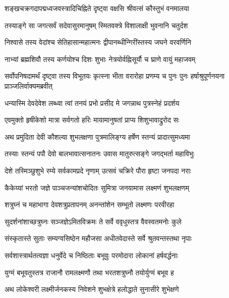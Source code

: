\twolineshloka
{शङ्खचक्रगदापद्मध्वजवस्त्रादिचिह्निते}
{दृष्ट्वा वक्षसि श्रीवत्सं कौस्तुभं वनमालया}%

\twolineshloka
{तस्याङ्गे सा जगत्सर्वं सदेवासुरमानुषम्}
{स्मितवक्त्रे विशालाक्षी भुवनानि चतुर्दश}%

\twolineshloka
{निश्वासे तस्य वेदांश्च सेतिहासान्महात्मनः}
{द्वीपानब्धीन्गिरींस्तस्य जघने वरवर्णिनि}%

\twolineshloka
{नाभ्यां ब्रह्मशिवौ तस्य कर्णयोश्च दिशः शुभाः}
{नेत्रयोर्वह्निसूर्यौ च घ्राणे वायुं महाजवम्}%


\threelineshloka
{सर्वोपनिषदामर्थं दृष्ट्वा तस्य विभूतयः}
{कृत्स्ना भीता वरारोहा प्रणम्य च पुनः पुनः}
{हर्षाश्रुपूर्णनयना प्राञ्जलिर्वाक्यमब्रवीत्}%


\twolineshloka
{धन्यास्मि देवदेवेश लब्ध्वा त्वां तनयं प्रभो}
{प्रसीद मे जगन्नाथ पुत्रस्नेहं प्रदर्शय}%


\twolineshloka
{एवमुक्तो हृषीकेशो मात्रा सर्वगतो हरिः}
{मायामानुषतां प्राप्य शिशुभावाद्रुरोद सः}%

\twolineshloka
{अथ प्रमुदिता देवी कौशल्या शुभलक्षणा}
{पुत्रमालिङ्ग्य हर्षेण स्तन्यं प्रादात्सुमध्यमा}%

\twolineshloka
{तस्याः स्तन्यं पपौ देवो बालभावात्सनातनः}
{उवास मातुरुत्सङ्गे जगद्भर्ता महाविभुः}%

\twolineshloka
{देशे तस्मिञ्छुशुभे रम्ये सर्वकामप्रदे नृणाम्}
{उत्सवं चक्रिरे पौरा हृष्टा जनपदा नराः}%

\twolineshloka
{कैकेय्यां भरतो जज्ञे पाञ्चजन्यांशचोदितः}
{सुमित्रा जनयामास लक्ष्मणं शुभलक्षणम्}%

\twolineshloka
{शत्रुघ्नं च महाभागा देवशत्रुप्रतापनम्}
{अनन्तांशेन सम्भूतो लक्ष्मणः परवीरहा}%

\twolineshloka
{सुदर्शनांशाच्छत्रुघ्नः सञ्जज्ञेऽमितविक्रमः}
{ते सर्वे ववृधुस्तत्र वैवस्वतमनोः कुले}%

\twolineshloka
{संस्कृतास्ते सुताः सम्यग्वसिष्ठेन महौजसा}
{अधीतवेदास्ते सर्वे श्रुतवन्तस्तथा नृपाः}%

\twolineshloka
{सर्वशास्त्रार्थतत्वज्ञा धनुर्वेदे च निष्ठिताः}
{बभूवुः परमोदारा लोकानां हर्षवर्द्धनाः}%

\twolineshloka
{युग्मं बभूवतुस्तत्र राजानौ रामलक्ष्मणौ}
{तथा भरतशत्रुघ्नौ तयोर्युग्मं बभूव ह}%

\twolineshloka
{अथ लोकेश्वरी लक्ष्मीर्जनकस्य निवेशने}
{शुभक्षेत्रे हलोद्धाते सुनासीरे शुभेक्षणे}%

